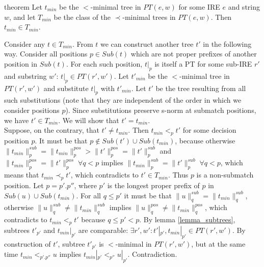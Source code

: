\documentclass[AMA,STIX1COL]{WileyNJD-v2}
\newcommand{\PT}{PT}
\newcommand{\pnorm}[2]{\|{#1}\|^{pos}_{#2}}
\newcommand{\snorm}[2]{\|{#1}\|^{sub}_{#2}}
\begin{document}
\begin{theoremEnd}[restate, no link to proof, no link to theorem, category=theorem_order_compat]{theorem}
    \label{theorem_order_compat}
    Let $t_{min}$ be the $<$-minimal tree in $\PT(e,w)$ for some IRE $e$ and string $w$,
    and let $T_{min}$ be the class of the $\prec$-minimal trees in $\PT(e,w)$.
    Then $t_{min} \in T_{min}$.
\end{theoremEnd}
\begin{proofEnd}
    Consider any $t \in T_{min}$.
    From $t$ we can construct another tree $t'$ in the following way.
    Consider all positions $p \in Sub(t)$ which are not proper prefixes of another position in $Sub(t)$.
    For each such position, $t|_p$ is itself a PT for some sub-IRE $r'$ and substring $w'$: $t|_p \in \PT(r', w')$.
    Let $t'_{min}$ be the $<$-minimal tree in $\PT(r', w')$ and substitute $t|_p$ with $t'_{min}$.
    Let $t'$ be the tree resulting from all such substitutions
    (note that they are independent of the order in which we consider positions $p$).
    Since substitutions preserve s-norm at submatch positions, we have $t' \in T_{min}$.
    We will show that $t' = t_{min}$.
    \\[0.5em]
    Suppose, on the contrary, that $t' \neq t_{min}$.
    Then $t_{min} <_p t'$ for some decision position $p$.
    It must be that $p \not\in Sub(t') \cup Sub(t_{min})$, because
    otherwise $\snorm{t_{min}}{p} = \pnorm{t_{min}}{p} > \pnorm{t'}{p} = \snorm{t'}{p}$
    and $\pnorm{t_{min}}{p} = \pnorm{t'}{p} \; \forall q < p$ implies $\snorm{t_{min}}{p} = \snorm{t'}{p} \; \forall q < p$,
    which means that $t_{min} \prec_p t'$, which contradicts to $t' \in T_{min}$.
    Thus $p$ is a non-submatch position.
    Let $p = p'.p''$, where $p'$ is the longest proper prefix of $p$ in $Sub(u) \cup Sub(t_{min})$.
    For all $q \leq p'$ it must be that $\snorm{u}{q} = \snorm{t_{min}}{q}$,
    otherwise $\snorm{u}{q} \neq \snorm{t_{min}}{q}$ implies $\pnorm{u}{q} \neq \pnorm{t_{min}}{q}$,
    which contradicts to $t_{min} <_p t'$ because $q \leq p' < p$.
    By lemma \ref{lemma_subtrees}, subtrees $t'_{p'}$ and $t_{min}|_{p'}$ are comparable:
    $\exists r', w' : t'|_{p'}, t_{min}|_{p'} \in \PT(r', w')$.
    By construction of $t'$, subtree $t'_{p'}$ is $<$-minimal in $\PT(r', w')$,
    but at the same time $t_{min} <_{p'.p''} u$ implies $t_{min}|_{p'} <_{p''} u|_{p'}$.
    Contradiction.
\end{proofEnd}
\end{document}
